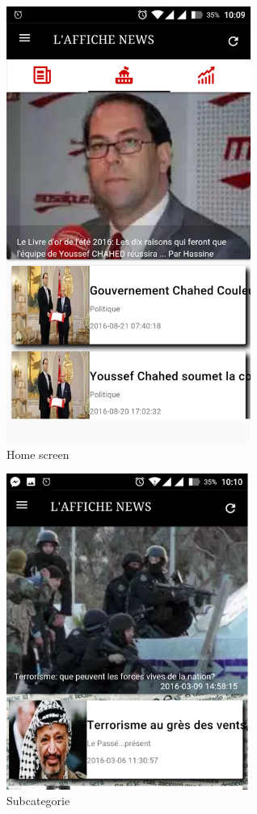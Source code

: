 \begin{figure}[H]
\centering
	\includegraphics[width=8cm]{screenshot2.png}
	\caption{Home screen}
	\label{screenshot}

\end{figure}

\begin{figure}[H]
\centering
	\includegraphics[width=8cm]{screenshot3.png}
	\caption{Subcategorie}
	\label{screenshot}

\end{figure}

